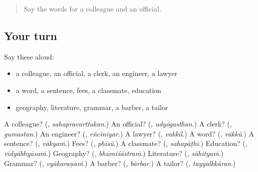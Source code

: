 \label{lesson:ML-R222-second-pass-words-from-chapters-220-222}



\begin{quote}
Say the words for a colleague and an official.
\end{quote}

\subsection*{Your turn}
Say these aloud:

\begin{itemize}
\raggedright
  \item a colleague, an official, a clerk, an engineer, a lawyer
  \item a word, a sentence, fees, a classmate, education
  \item geography, literature, grammar, a barber, a tailor
\end{itemize}

\begin{tcolorbox}[breakable,colback=teal!4,colframe=teal!35!black,title={Before you move on}]
A colleague? (\textbf{}, \emph{sahapravarttakan}.) An official? (\textbf{}, \emph{udyōgasthan}.) A clerk? (\textbf{}, \emph{gumastan}.) An engineer? (\textbf{}, \emph{eñcinīyar}.) A lawyer? (\textbf{}, \emph{vakkīl}.) A word? (\textbf{}, \emph{vākkŭ}.) A sentence? (\textbf{}, \emph{vākyaṁ}.) Fees? (\textbf{}, \emph{phīsŭ}.) A classmate? (\textbf{}, \emph{sahapāṭhi}.) Education? (\textbf{}, \emph{vidyābhyāsaṁ}.) Geography? (\textbf{}, \emph{bhūmiśāstraṁ}.) Literature? (\textbf{}, \emph{sāhityaṁ}.) Grammar? (\textbf{}, \emph{vyākaraṇaṁ}.) A barber? (\textbf{}, \emph{bārbar}.) A tailor? (\textbf{}, \emph{tayyalkkāran}.)
\end{tcolorbox}
